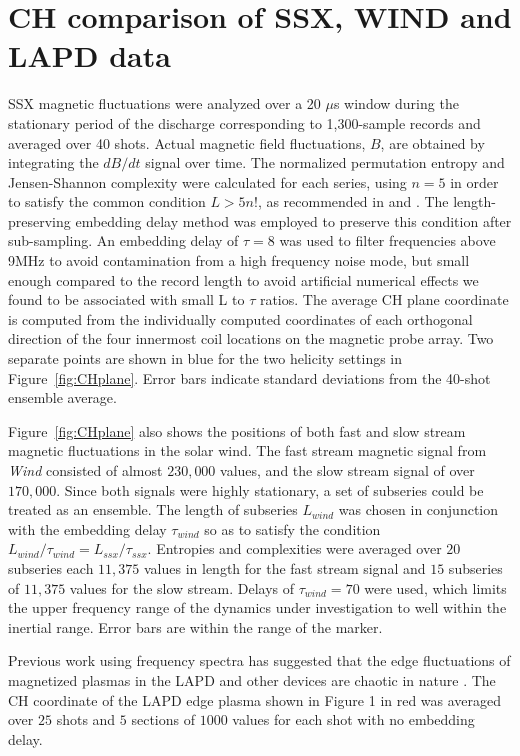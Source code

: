 \documentclass[aps,prx,twocolumn,secnumarabic,nobalancelastpage,amsmath,amssymb,
nofootinbib]{revtex4-1}
\begin{document}
\section{CH comparison of SSX, WIND and LAPD data}
SSX magnetic fluctuations were analyzed over a 20 $\mu$s window during the stationary period of the discharge corresponding to 1,300-sample records and averaged over 40 shots. Actual magnetic field fluctuations, $B$, are obtained by integrating the $dB/dt$ signal over time. The normalized permutation entropy and Jensen-Shannon complexity were calculated for each series, using $n=5$ in order to satisfy the common condition $L > 5n!$, as recommended in \cite{amigo2008} and \cite{riedl2013}. The length-preserving embedding delay method was employed to preserve this condition after sub-sampling. An embedding delay of $\tau=8$ was used to filter frequencies above 9MHz to avoid contamination from a high frequency noise mode, but small enough compared to the record length to avoid artificial numerical effects we found to be associated with small L to $\tau$ ratios. The average CH plane coordinate is computed from the individually computed coordinates of each orthogonal direction of the four innermost coil locations on the magnetic probe array. Two separate points are shown in blue for the two helicity settings in Figure~\ref{fig:CHplane}. Error bars indicate standard deviations from the 40-shot ensemble average.  

Figure~\ref{fig:CHplane} also shows the positions of both fast and slow stream magnetic fluctuations in the solar wind.  The fast stream magnetic signal from \textit{Wind} consisted of almost $230,000$ values, and the slow stream signal of over $170,000$. Since both signals were highly stationary, a set of subseries could be treated as an ensemble. The length of subseries $L_{wind}$ was chosen in conjunction with the embedding delay $\tau_{wind}$ so as to satisfy the condition $L_{wind}/\tau_{wind} = L_{ssx}/\tau_{ssx}$. Entropies and complexities were averaged over $20$ subseries each $11,375$ values in length for the fast stream signal and $15$ subseries of $11,375$ values for the slow stream. Delays of $\tau_{wind} = 70$ were used, which limits the  upper frequency range of the dynamics under investigation to well within the inertial range. Error bars are within the range of the marker.

Previous work using frequency spectra has suggested that the edge fluctuations of magnetized plasmas in the LAPD and other devices are chaotic in nature \cite{maggs2012}. The CH coordinate of the LAPD edge plasma shown in Figure 1 in red was averaged over $25$ shots and $5$ sections of $1000$ values for each shot with no embedding delay. 
\end{document}
